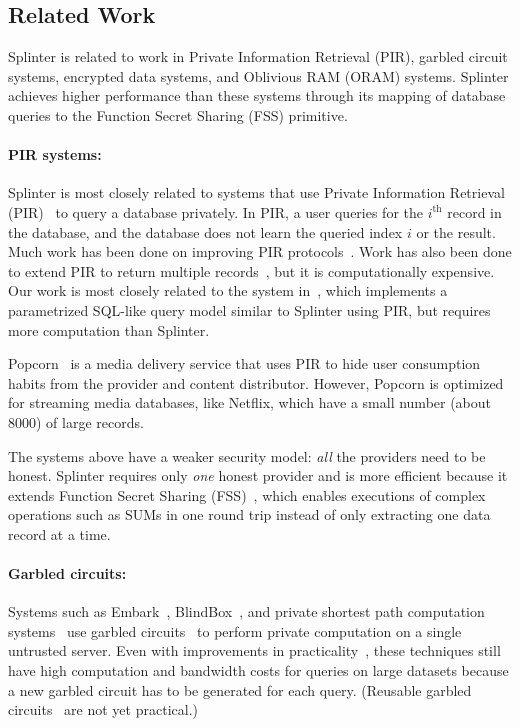 \subsection{Related Work}
\label{spl-sec:related}
Splinter is related to work in Private Information Retrieval (PIR),
garbled circuit systems, encrypted data systems, 
and Oblivious RAM (ORAM) systems. Splinter achieves higher performance than these systems 
through its mapping of database queries to the Function Secret Sharing (FSS) primitive.

\paragraph{PIR systems:}
Splinter is most closely related to systems that use Private
Information Retrieval (PIR)~\cite{chor1998private} to query a database privately.
In PIR, a user queries for the $i^\mathrm{th}$ record in the database, and the database
does not learn the queried index $i$ or the result.
Much work has been done on improving 
PIR protocols~\cite{ostrovsky2007survey, olumofin2011revisiting}. 
Work has also been done to extend PIR to return multiple records~\cite{groth2010multi},
but it is computationally expensive.
Our work is most closely related to the system in~\cite{goldberg}, which implements
a parametrized SQL-like query model similar to Splinter using PIR, but requires
more computation than Splinter.

Popcorn~\cite{popcorn} is a media delivery service that 
uses PIR to hide user consumption habits from the provider
and content distributor. However, Popcorn is optimized for
streaming media databases, like Netflix, which have a small number (about 8000)
of large records. 

The systems above have a weaker
security model: \textit{all} the providers need to be honest.
Splinter requires only \textit{one} honest provider and 
is more efficient because it 
extends Function Secret Sharing (FSS)~\cite{fss,gilboa2014distributed}, which 
enables executions of complex operations such as SUMs in one round trip
instead of only extracting one data record at a time.

\paragraph{Garbled circuits:}
Systems such as Embark~\cite{lan2016embark}, BlindBox~\cite{blindbox}, 
and private shortest path computation systems~\cite{wu2016}
use garbled circuits~\cite{Yao, goldwasser1997multi} to perform private computation
on a single untrusted server.
Even with improvements in practicality~\cite{bellare2013efficient}, these
techniques still have high computation and bandwidth costs for queries on
large datasets because a new garbled circuit has to be generated for each query.
(Reusable garbled circuits~\cite{goldwasser:sfe} are not yet practical.)

